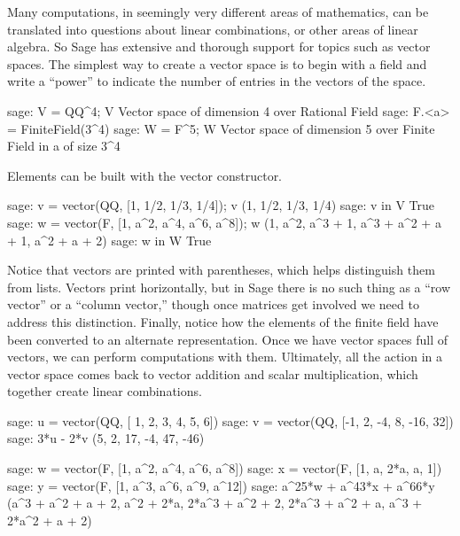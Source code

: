 Many computations, in seemingly very different areas of mathematics, can be translated into questions about linear combinations, or other areas of linear algebra.  So Sage has extensive and thorough support for topics such as vector spaces.
%
%
The simplest way to create a vector space is to begin with a field and write a ``power'' to indicate the number of entries in the vectors of the space.
%
\begin{sageexample}
sage: V = QQ^4; V
Vector space of dimension 4 over Rational Field
sage: F.<a> = FiniteField(3^4)
sage: W = F^5; W
Vector space of dimension 5 over Finite Field in a of size 3^4                                                                                                            \end{sageexample}
%
Elements can be built with the vector constructor.
%
\begin{sageexample}
sage: v = vector(QQ, [1, 1/2, 1/3, 1/4]); v
(1, 1/2, 1/3, 1/4)
sage: v in V
True
sage: w = vector(F, [1, a^2, a^4, a^6, a^8]); w
(1, a^2, a^3 + 1, a^3 + a^2 + a + 1, a^2 + a + 2)
sage: w in W
True
\end{sageexample}
%
Notice that vectors are printed with parentheses, which helps distinguish them from lists.  Vectors print horizontally, but in Sage there is no such thing as a ``row vector'' or a ``column vector,'' though once matrices get involved we need to address this distinction.  Finally, notice how the elements of the finite field have been converted to an alternate representation.
%
Once we have vector spaces full of vectors, we can perform computations with them.  Ultimately, all the action in a vector space comes back to vector addition and scalar multiplication, which together create linear combinations.
%
\begin{sageexample}
sage: u = vector(QQ, [ 1, 2,  3, 4,   5,  6])
sage: v = vector(QQ, [-1, 2, -4, 8, -16, 32])
sage: 3*u - 2*v
(5, 2, 17, -4, 47, -46)                                                                                                                                                   \end{sageexample}
%
\begin{sageexample}
sage: w = vector(F, [1, a^2, a^4, a^6,  a^8])
sage: x = vector(F, [1,   a, 2*a,   a,    1])
sage: y = vector(F, [1, a^3, a^6, a^9, a^12])
sage: a^25*w + a^43*x + a^66*y
(a^3 + a^2 + a + 2, a^2 + 2*a, 2*a^3 + a^2 + 2, 2*a^3 + a^2 + a,
 a^3 + 2*a^2 + a + 2)
\end{sageexample}
